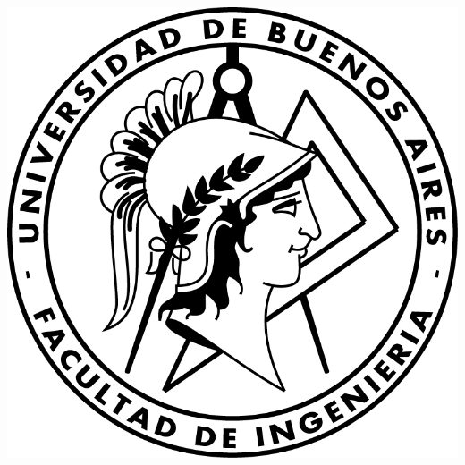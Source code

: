 
\thispagestyle{empty}
\begin{titlepage}

\begin{minipage}{0.48\textwidth} \begin{flushleft}
\includegraphics[scale = 0.61]{images/logo_fiuba.png}
\end{flushleft}\end{minipage}
\begin{minipage}{0.6\textwidth} \begin{flushright}
    \textsc{\Large \universidad}\\[0.5 cm]	%
    \textsc{\Large \facultad}\\[2.0 cm]	%
\end{flushright}\end{minipage}


\end{titlepage}
